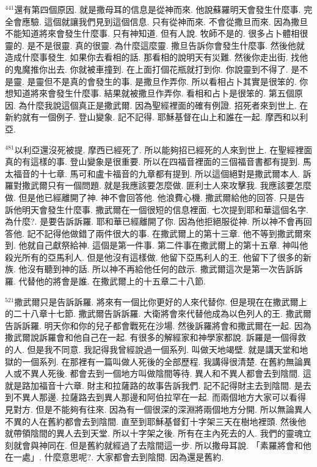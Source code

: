 \documentclass{book}
\begin{document}
$^{441}$還有第四個原因.
就是撒母耳的信息是從神而來.
他說蘇羅明天會發生什麼事.
完全會應驗.
這個就讓我們見到這個信息.
只有從神而來.
不會從撒旦而來.
因為撒旦不能知道將來會發生什麼事.
只有神知道.
但有人說.
牧師不是的.
很多占卜體相很靈的.
是不是很靈.
真的很靈.
為什麼這麼靈.
撒旦告訴你會發生什麼事.
然後他就造成什麼事發生.
如果你去看相的話.
那看相的說明天有災難.
然後你走出街.
找他的鬼魔推你出去.
你就被車撞到.
在上面打個花瓶就打到你.
你說靈到不得了.
是不是靈.
是靈但不是真的會發生的事.
是撒旦作弄你.
所以看相占卜其實是很笨的.
你想知道將來會發生什麼事.
結果就被撒旦作弄你.
看相和占卜是很笨的.
第五個原因.
為什麼我說這個真正是撒武爾.
因為聖經裡面的確有例證.
招死者來到世上.
在新約就有一個例子.
登山變象.
記不記得.
耶穌基督在山上和誰在一起.
摩西和以利亞.

$^{481}$以利亞還沒死被提.
摩西已經死了.
所以能夠招已經死的人來到世上.
在聖經裡面真的有這樣的事.
登山變象是很重要.
所以在四福音裡面的三個福音書都有提到.
馬太福音的十七章.
馬可和盧卡福音的九章都有提到.
所以這個絕對是撒武爾本人.
訴羅對撒武爾只有一個問題.
就是我應該要怎麼做.
匪利士人來攻擊我.
我應該要怎麼做.
但是他已經離開了神.
神不會回答他.
他浪費心機.
撒武爾給他的回答.
只是告訴他明天會發生什麼事.
撒武爾在一個很短的信息裡面.
七次提到耶和華這個名字.
為什麼?.
是要告訴訴羅.
耶和華已經離開了你.
因為他拒絕服從神.
所以神不會再回答他.
記不記得他做錯了兩件很大的事.
在撒武爾上的第十三章.
他不等到撒武爾來到.
他就自己獻祭給神.
這個是第一件事.
第二件事在撒武爾上的第十五章.
神叫他殺光所有的亞馬利人.
但是他沒有這樣做.
他留下亞馬利人的王.
他留下了很多的新族.
他沒有聽到神的話.
所以神不再給他任何的啟示.
撒武爾這次是第一次告訴訴羅.
代替他的將會是誰.
在撒武爾上的十五章二十八節.

$^{521}$撒武爾只是告訴訴羅.
將來有一個比你更好的人來代替你.
但是現在在撒武爾上的二十八章十七節.
撒武爾告訴訴羅.
大衛將會來代替他成為以色列人的王.
撒武爾告訴訴羅.
明天你和你的兒子都會戰死在沙場.
然後訴羅將會和撒武爾在一起.
因為撒武爾說訴羅會和他自己在一起.
有很多的解經家和神學家都說.
訴羅是一個得救的人.
但是我不同意.
我記得我曾經說過一個系列.
叫做天地竭壁.
就是講天堂和地獄的一個系列.
在那裡有一篇叫做人死後的全部歷程.
我講得很清楚.
在舊約無論異人或不異人死後.
都會去到一個地方叫做陰間等待.
異人和不異人都會去到陰間.
這就是路加福音十六章.
財主和拉薩路的故事告訴我們.
記不記得財主去到陰間.
是去到不異人那邊.
拉薩路去到異人那邊和阿伯拉罕在一起.
而兩個地方大家可以看得見對方.
但是不能夠有往來.
因為有一個很深的深淵將兩個地方分開.
所以無論異人不異的人在舊約都會去到陰間.
直至到耶穌基督釘十字架三天在樹地裡頭.
然後他就帶領陰間的異人去到天堂.
所以十字架之後.
所有在主內死去的人.
我們的靈魂立刻就會與神同在.
但是舊約就經過了去陰間這一步.
所以撒母耳說.
「素羅將會和他在一處」.
什麼意思呢?.
大家都會去到陰間.
因為還是舊約.
\end{document}
